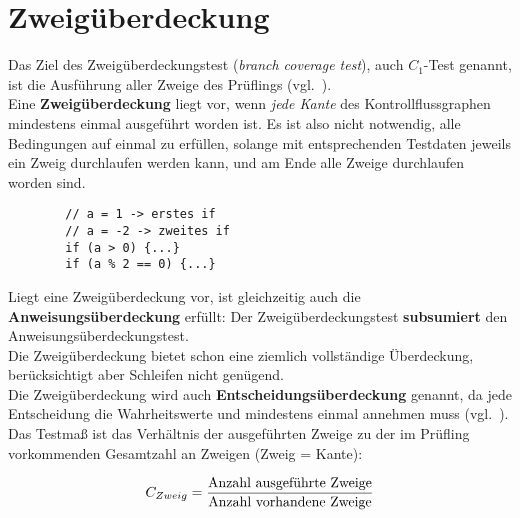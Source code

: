 \section{Zweigüberdeckung}


\begin{tcolorbox}[title=Zweigüberdeckung ($C_1$-Test)]
    Das Ziel des Zweigüberdeckungstest (\textit{branch coverage test}), auch $C_1$-Test genannt, ist die Ausführung aller Zweige des Prüflings  (vgl.~\cite[88]{Lig09a}).\\

    Eine \textbf{Zweigüberdeckung} liegt vor, wenn \textit{jede Kante} des Kontrollflussgraphen mindestens einmal ausgeführt worden ist.
    Es ist also nicht notwendig, alle Bedingungen auf einmal zu erfüllen, solange mit entsprechenden Testdaten jeweils ein Zweig durchlaufen werden kann, und am Ende alle Zweige durchlaufen worden sind.
    \begin{verbatim}
        // a = 1 -> erstes if
        // a = -2 -> zweites if
        if (a > 0) {...}
        if (a % 2 == 0) {...}
    \end{verbatim}
    Liegt eine Zweigüberdeckung vor, ist gleichzeitig auch die \textbf{Anweisungsüberdeckung} erfüllt: Der Zweigüberdeckungstest \textbf{subsumiert} den Anweisungsüberdeckungstest.\\

    \noindent
    Die Zweigüberdeckung bietet schon eine ziemlich vollständige Überdeckung, berücksichtigt aber Schleifen nicht genügend.\\

    \noindent
    Die Zweigüberdeckung wird auch \textbf{Entscheidungsüberdeckung} genannt, da jede Entscheidung die Wahrheitswerte  und  mindestens einmal annehmen muss (vgl.~\cite[404]{Bal97}).\\


    \noindent
    Das Testmaß ist das Verhältnis der ausgeführten Zweige zu der im Prüfling vorkommenden Gesamtzahl an Zweigen (Zweig = Kante):

    \begin{equation}\notag
    C_{Zweig} = \frac{\text{Anzahl ausgeführte Zweige}}{\text{Anzahl vorhandene Zweige}}
    \end{equation}
\end{tcolorbox}